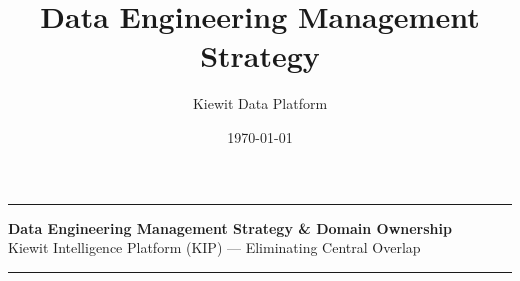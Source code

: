 \documentclass[10pt, a4paper]{article}
\title{Data Engineering Management Strategy}
\author{Kiewit Data Platform}
\date{\today}
\begin{document}
\pagestyle{fancy}
\renewcommand{\thepage}{\arabic{page}}
\thispagestyle{fancy}

\begin{center}
    \noindent\rule{\linewidth}{1.5pt}
    
    \vspace{0.05em}
    
    {\large \textbf{Data Engineering Management Strategy \& Domain Ownership}} \\[0.05em]
    {\footnotesize Kiewit Intelligence Platform (KIP) --- Eliminating Central Overlap}
    
    \vspace{0.05em}
    
    \noindent\rule{\linewidth}{1.5pt}
\end{center}

\vspace{0.15em}
\end{document}
